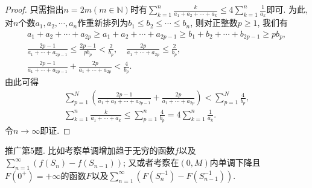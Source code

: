 \begin{quizb}
\begin{proof}
只需指出\(n=2m(m\in\mathbb{N})\)时有\(\sum_{k=1}^{n}\frac{k}{a_1+a_2+\cdots+a_k}\leqslant 4\sum_{k=1}^{n}\frac{1}{a_k}\)即可. 为此, 对\(n\)个数\(a_1,a_2,\cdots,a_n\)作重新排列为\(b_1\leqslant b_2\leqslant \cdots\leqslant b_n\), 则对正整数\(p\geqslant 1\), 我们有\begin{gather*}
a_1+a_2+\cdots+a_{2p}\geqslant a_1+a_2+\cdots+a_{2p-1}\geqslant b_1+b_2+\cdots+b_{2p-1}\geqslant pb_{p},\\
\frac{2p-1}{a_1+\cdots+a_{2p-1}}\leqslant \frac{2p-1}{pb_p}<\frac{2}{b_p},\quad\frac{2p}{a_1+\cdots+a_{2p}}\leqslant\frac{2}{b_p},\\
\frac{2p-1}{a_1+\cdots+a_{2p-1}}+\frac{2p}{a_1+\cdots+a_{2p}}<\frac{4}{b_p}.
\end{gather*}由此可得\begin{gather*}
\sum_{p=1}^{N}\left(\frac{2p-1}{a_1+a_2+\cdots+a_{2p-1}}+\frac{2p}{a_1+\cdots+a_{2p}}\right)<\sum_{p=1}^{N}\frac{4}{b_p},\\
\sum_{k=1}^{n}\frac{k}{a_1+\cdots+a_k}\leqslant\sum_{p=1}^{n}\frac{4}{b_p}=4\sum_{k=1}^{n}\frac{1}{a_k}.
\end{gather*}令\(n\rightarrow\infty\)即证.
\end{proof} 
\woe 推广第5题. 比如考察单调增加趋于无穷的函数\(f\)以及\(\sum_{n=1}^{\infty}\left(f(S_n)-f(S_{n-1})\right)\); 又或者考察在\((0,M)\)内单调下降且\(F(0^+)=+\infty\)的函数\(F\)以及\(\sum_{n=1}^{\infty}\left(F(S_n^{-1})-F(S_{n-1}^{-1})\right)\).
\end{quizb}

